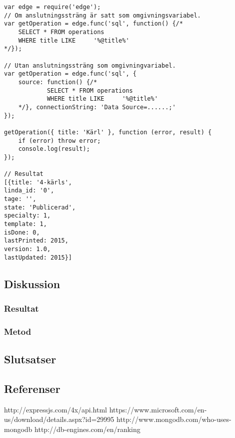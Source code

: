 \begin{verbatim}
var edge = require('edge');
// Om anslutningssträng är satt som omgivningsvariabel.
var getOperation = edge.func('sql', function() {/*
    SELECT * FROM operations
    WHERE title LIKE	 '%@title%'
*/});

// Utan anslutningssträng som omgivningvariabel.
var getOperation = edge.func('sql', {
	source: function() {/*
    		SELECT * FROM operations
    		WHERE title LIKE	 '%@title%'
	*/}, connectionString: 'Data Source=......;'
});

getOperation({ title: 'Kärl' }, function (error, result) {
    if (error) throw error;
    console.log(result);
});

// Resultat
[{title: '4-kärls',
linda_id: '0',
tage: '',
state: 'Publicerad',
specialty: 1,
template: 1,
isDone: 0,
lastPrinted: 2015,
version: 1.0,
lastUpdated: 2015}]

\end{verbatim}

\subsection{Diskussion}
\subsubsection{Resultat}
\subsubsection{Metod}
\subsection{Slutsatser}
\subsection{Referenser}
\vspace{-9mm}
\begin{thebibliography}{9}
http://expressjs.com/4x/api.html
https://www.microsoft.com/en-us/download/details.aspx?id=29995
http://www.mongodb.com/who-uses-mongodb
http://db-engines.com/en/ranking
\end{thebibliography}
